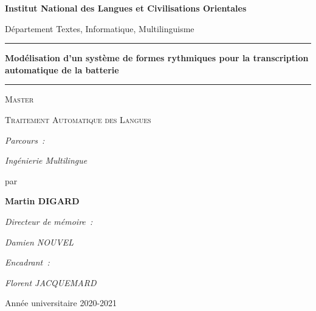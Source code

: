 \begin{center}
{\Large \textbf{Institut National des Langues et Civilisations Orientales}}


{\normalsize Département Textes, Informatique, Multilinguisme}

\hrule
{}
{\LARGE \textbf{Modélisation d'un système de formes rythmiques pour la transcription automatique de la batterie}}
\hrule


{\Huge \textsc{Master}}


{\LARGE \textsc{Traitement Automatique des Langues}}


{\normalsize \emph{Parcours~:}}


{\normalsize \emph{Ingénierie Multilingue}}


{\large par}


\textbf{{\LARGE Martin \textsc{DIGARD}}}


{\normalsize \emph{Directeur de mémoire~:}}


{\normalsize \emph{Damien NOUVEL}}


{\normalsize \emph{Encadrant~:}}


{\normalsize \emph{Florent JACQUEMARD}}


{\normalsize Année universitaire 2020-2021}

\end{center}

\cleardoublepage %
